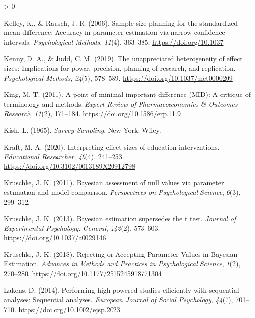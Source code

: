 \documentclass[
  english,
  ,jou, a4paper,floatsintext]{apa6}
\newlength{\cslhangindent}
\newenvironment{CSLReferences}[2] %
 {%
  \setlength{\parindent}{0pt}
  \ifodd #1 \everypar{\setlength{\hangindent}{\cslhangindent}}\ignorespaces\fi
  \ifnum #2 > 0
  \setlength{\parskip}{#2\baselineskip}
  \fi
 }%
 {}
\begin{document}
\begin{CSLReferences}{1}{0}
\leavevmode\hypertarget{ref-kelley_sample_2006}{}%
Kelley, K., \& Rausch, J. R. (2006). Sample size planning for the standardized mean difference: Accuracy in parameter estimation via narrow confidence intervals. \emph{Psychological Methods}, \emph{11}(4), 363--385. \url{https://doi.org/10.1037}

\leavevmode\hypertarget{ref-kenny_unappreciated_2019}{}%
Kenny, D. A., \& Judd, C. M. (2019). The unappreciated heterogeneity of effect sizes: Implications for power, precision, planning of research, and replication. \emph{Psychological Methods}, \emph{24}(5), 578--589. \url{https://doi.org/10.1037/met0000209}

\leavevmode\hypertarget{ref-king_point_2011}{}%
King, M. T. (2011). A point of minimal important difference ({MID}): A critique of terminology and methods. \emph{Expert Review of Pharmacoeconomics \& Outcomes Research}, \emph{11}(2), 171--184. \url{https://doi.org/10.1586/erp.11.9}

\leavevmode\hypertarget{ref-kish_survey_1965}{}%
Kish, L. (1965). \emph{Survey {Sampling}}. {New York}: {Wiley}.

\leavevmode\hypertarget{ref-kraft_interpreting_2020}{}%
Kraft, M. A. (2020). Interpreting effect sizes of education interventions. \emph{Educational Researcher}, \emph{49}(4), 241--253. \url{https://doi.org/10.3102/0013189X20912798}

\leavevmode\hypertarget{ref-kruschke_bayesian_2011}{}%
Kruschke, J. K. (2011). Bayesian assessment of null values via parameter estimation and model comparison. \emph{Perspectives on Psychological Science}, \emph{6}(3), 299--312.

\leavevmode\hypertarget{ref-kruschke_bayesian_2013}{}%
Kruschke, J. K. (2013). Bayesian estimation supersedes the t test. \emph{Journal of Experimental Psychology: General}, \emph{142}(2), 573--603. \url{https://doi.org/10.1037/a0029146}

\leavevmode\hypertarget{ref-kruschke_rejecting_2018}{}%
Kruschke, J. K. (2018). Rejecting or {Accepting Parameter Values} in {Bayesian Estimation}. \emph{Advances in Methods and Practices in Psychological Science}, \emph{1}(2), 270--280. \url{https://doi.org/10.1177/2515245918771304}

\leavevmode\hypertarget{ref-lakens_performing_2014}{}%
Lakens, D. (2014). Performing high-powered studies efficiently with sequential analyses: Sequential analyses. \emph{European Journal of Social Psychology}, \emph{44}(7), 701--710. \url{https://doi.org/10.1002/ejsp.2023}


\end{CSLReferences}
\end{document}
